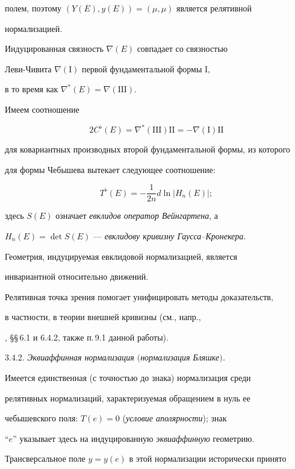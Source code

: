 полем, поэтому $(Y(E),y(E)) = (\mu, \mu)$ является релятивной


нормализацией.


Индуцированная связность $\nabla (E)$ совпадает со связностью


Леви-Чивита $\nabla (\mathrm I)$ первой фундаментальной формы $\mathrm I$,


в то время как $\nabla^*(E) = \nabla(\mathrm{III})$.


Имеем соотношение


$$


2 C^{\flat}(E) = \nabla^*(\mathrm {III}) \mathrm{II}=-\nabla


(\mathrm {I}) \mathrm{II}


$$


для ковариантных производных второй фундаментальной формы, из которого


для формы Чебышева вытекает следующее соотношение: 


$$


T^{\flat}(E) = - \frac {1}{2n} d \ln|H_n(E)|;


$$


здесь $S(E)$ означает {\it евклидов оператор Вейнгартена}, а


$H_n(E)= \det S(E)$ --- {\it евклидову кривизну Гаусса--Кронекера}.


Геометрия, индуцируемая евклидовой нормализацией, является


инвариантной относительно движений.


Релятивная точка зрения помогает унифицировать методы доказательств,


в частности, в теории внешней кривизны (см., напр.,


\cite{SIM-S-V}, \S\S\,6.1 и 6.4.2, также п.\,9.1 данной работы).


\smallskip 





3.4.2. {\it Эквиаффинная нормализация $($нормализация Бляшке$)$.}


Имеется единственная (с точностью до знака) нормализация среди


релятивных нормализаций, характеризуемая обращением в нуль ее


чебышевского поля: $T(e) = 0$ ({\it условие аполярности}); знак


``$e$'' указывает здесь на индуцированную {\it эквиаффинную} геометрию.


Трансверсальное поле $y=y(e)$ в этой нормализации исторически принято


